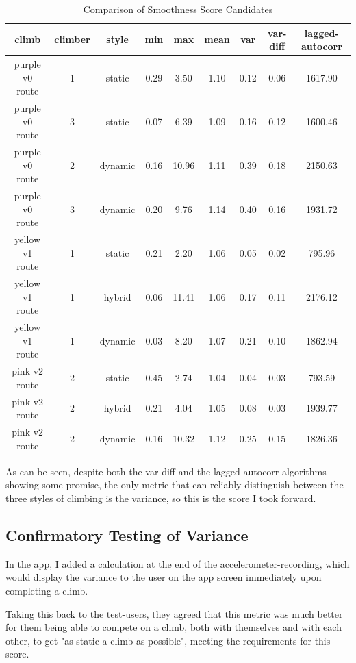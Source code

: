 \begin{table}[h]
\centering
\begin{tabular}{|c|c|c|c|c|c|c|c|c|}
\hline
climb  &  climber & style & min & max & mean & var & var-diff & lagged-autocorr \\ \hline
purple v0 route & 1 & static  & 0.29 & 3.50 & 1.10 & 0.12 & 0.06 & 1617.90 \\ \hline
purple v0 route & 3 & static  & 0.07 & 6.39 & 1.09 & 0.16 & 0.12 & 1600.46 \\ \hline
purple v0 route & 2 & dynamic & 0.16 & 10.96 & 1.11 & 0.39 & 0.18 & 2150.63 \\ \hline
purple v0 route & 3 & dynamic & 0.20 & 9.76 & 1.14 & 0.40 & 0.16 & 1931.72 \\ \hline
yellow v1 route & 1 & static  & 0.21 & 2.20 & 1.06 & 0.05 & 0.02 & 795.96 \\ \hline
yellow v1 route & 1 & hybrid & 0.06 & 11.41 & 1.06 & 0.17 & 0.11 & 2176.12 \\ \hline
yellow v1 route & 1 & dynamic & 0.03 & 8.20 & 1.07 & 0.21 & 0.10 & 1862.94 \\ \hline
pink v2 route & 2 & static & 0.45 & 2.74 & 1.04 & 0.04 & 0.03 & 793.59 \\ \hline
pink v2 route & 2 & hybrid & 0.21 & 4.04 & 1.05 & 0.08 & 0.03 & 1939.77 \\ \hline
pink v2 route & 2 & dynamic & 0.16 & 10.32 & 1.12 & 0.25 & 0.15 & 1826.36 \\ \hline

\end{tabular}
\caption{Comparison of Smoothness Score Candidates}
\label{tab:smoothnesses}
\end{table}

As can be seen, despite both the var-diff and the lagged-autocorr algorithms showing some promise, the only metric that can reliably distinguish between the three styles of climbing is the variance, so this is the score I took forward.


\subsection{Confirmatory Testing of Variance}
In the app, I added a calculation at the end of the accelerometer-recording, which would display the variance to the user on the app screen immediately upon completing a climb.

Taking this back to the test-users, they agreed that this metric was much better for them being able to compete on a climb, both with themselves and with each other, to get "as static a climb as possible", meeting the requirements for this score.

